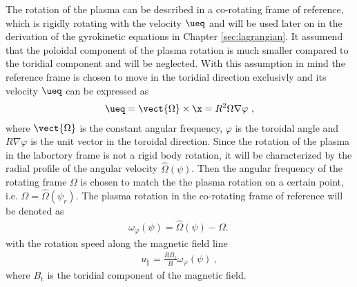 The rotation of the plasma can be described in a co-rotating frame of reference, which is rigidly rotating with the velocity $\ueq$ and will be used later on in the derivation of the gyrokinetic equations in Chapter \ref{sec:lagrangian}. It assumend that the poloidal component of the plasma rotation is much smaller compared to the toridial component and will be neglected. With this assumption in mind the reference frame is chosen to move in the toridial direction exclusivly and its velocity $\ueq$ can be expressed as
\begin{gather}
    \ueq = \vect{\Omega} \times \x = R^2 \Omega \nabla \varphi~,
    \label{eq:rotvelocity}
\end{gather}
where $\vect{\Omega}$ is the constant angular frequency, $\varphi$ is the toroidal angle and $R \nabla\varphi$ is the unit vector in the toroidal direction. Since the rotation of the plasma in the labortory frame is not a rigid body rotation, it will be characterized by the radial profile of the angular velocity $\hat{\Omega}(\psi)$. Then the angular frequency of the rotating frame $\Omega$ is chosen to match the the plasma rotation on a certain point, i.e. $\Omega = \hat{\Omega}(\psi_r)$. The plasma rotation in the co-rotating frame of reference will be denoted as
\begin{gather}
    \omega_\varphi(\psi) = \hat{\Omega}(\psi) - \Omega.\
    \label{eq:refFramePlasmaFrequency}
\end{gather} 
with the rotation speed along the magnetic field line 
\begin{gather}
    u_\parallel = \frac{RB_\mathrm{t}}{B} \omega_\varphi (\psi)~,
\end{gather}
where $B_\mathrm{t}$ is the toridial component of the magnetic field. \cite{Peeters2009B}

\newpage